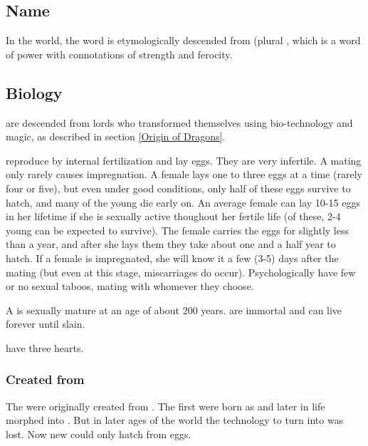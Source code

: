 \subsection{Name}
In the \Miith{} world, the word \quo{\dragon} is etymologically descended from \emph{\Draecchonosh{}} (plural \emph{\Draecchonosh{}}, which is a \draconic{} word of power with connotations of strength and ferocity. 









\subsection{Biology}
\Dragons{} are descended from \naga{} lords who transformed themselves using bio-technology and magic, as described in section \ref{Origin of Dragons}. 

\Dragons{} reproduce by internal fertilization and lay eggs. They are very infertile. A mating only rarely causes impregnation. A female lays one to three eggs at a time (rarely four or five), but even under good conditions, only half of these eggs survive to hatch, and many of the young die early on. An average female can lay 10-15 eggs in her lifetime if she is sexually active thoughout her fertile life (of these, 2-4 young can be expected to survive). The female carries the eggs for slightly less than a year, and after she lays them they take about one and a half year to hatch. If a female is impregnated, she will know it a few (3-5) days after the mating (but even at this stage, miscarriages do occur).  
Psychologically \dragons{} have few or no sexual taboos, mating with whomever they choose. 

A \dragon{} is sexually mature at an age of about 200 years. 
\Dragons{} are immortal and can live forever until slain. 

\Dragons{} have three hearts. 





\subsubsection{Created from \ophidians}
The \dragons were originally created from \ophidians.
The first \dragons were born as \ophidians and later in life morphed into \dragons.
But in later ages of the world the technology to turn \ophidians into \dragons was lost.
Now new \dragons could only hatch from \dragon eggs.





